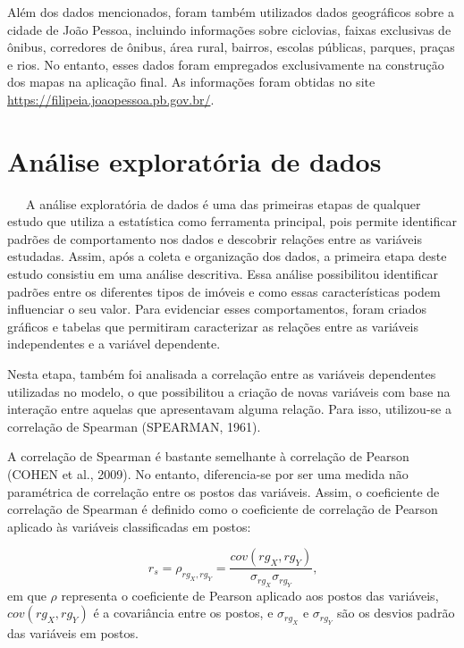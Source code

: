 \documentclass[
  12pt,
  a4paper,
]{scrreprt}
\begin{document}
\vspace{12pt}

Além dos dados mencionados, foram também utilizados dados geográficos
sobre a cidade de João Pessoa, incluindo informações sobre ciclovias,
faixas exclusivas de ônibus, corredores de ônibus, área rural, bairros,
escolas públicas, parques, praças e rios. No entanto, esses dados foram
empregados exclusivamente na construção dos mapas na aplicação final. As
informações foram obtidas no site
\url{https://filipeia.joaopessoa.pb.gov.br/}.

\section{Análise exploratória de
dados}\label{anuxe1lise-exploratuxf3ria-de-dados}

~~~A análise exploratória de dados é uma das primeiras etapas de
qualquer estudo que utiliza a estatística como ferramenta principal,
pois permite identificar padrões de comportamento nos dados e descobrir
relações entre as variáveis estudadas. Assim, após a coleta e
organização dos dados, a primeira etapa deste estudo consistiu em uma
análise descritiva. Essa análise possibilitou identificar padrões entre
os diferentes tipos de imóveis e como essas características podem
influenciar o seu valor. Para evidenciar esses comportamentos, foram
criados gráficos e tabelas que permitiram caracterizar as relações entre
as variáveis independentes e a variável dependente.

\vspace{12pt}

Nesta etapa, também foi analisada a correlação entre as variáveis
dependentes utilizadas no modelo, o que possibilitou a criação de novas
variáveis com base na interação entre aquelas que apresentavam alguma
relação. Para isso, utilizou-se a correlação de Spearman (SPEARMAN,
1961).

\vspace{12pt}

A correlação de Spearman é bastante semelhante à correlação de Pearson
(COHEN et al., 2009). No entanto, diferencia-se por ser uma medida não
paramétrica de correlação entre os postos das variáveis. Assim, o
coeficiente de correlação de Spearman é definido como o coeficiente de
correlação de Pearson aplicado às variáveis classificadas em postos:

\[
r_{s} = \rho_{rg_{X}, rg_{Y}} = \frac{cov\left(rg_{X}, rg_{Y}\right)}{\sigma_{rg_X}\sigma_{rg_Y}} \text{,}
\] em que \(\rho\) representa o coeficiente de Pearson aplicado aos
postos das variáveis, \(cov\left(rg_{X}, rg_{Y}\right)\) é a covariância
entre os postos, e \(\sigma_{rg_X}\) e \(\sigma_{rg_Y}\) são os desvios
padrão das variáveis em postos.
\end{document}
